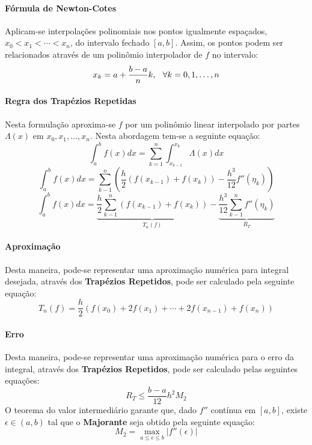 \documentclass{article}
\begin{document}
            \paragraph{Fórmula de Newton-Cotes}Aplicam-se interpolações polinomiais nos pontos igualmente espaçados, $x_{0} < x_{1} < \cdots < x_{n}$, do intervalo fechado $[a, b]$. Assim, os pontos podem ser relacionados através de um polinômio interpolador de $f$ no intervalo:
                \[x_{k} = a + \frac{b - a}{n} k, \hspace{2.5mm} \forall k = 0, 1, \dots, n\]

            \paragraph{Regra dos Trapézios Repetidas}Nesta formulação aproxima-se $f$ por um polinômio linear interpolado por partes $\Lambda(x)$ em $x_{0}, x_{1}, \dots, x_{n}$. Nesta abordagem tem-se a seguinte equação:
                \[\int_{a}^{b} f(x) dx = \sum_{k = 1}^{n} \int_{x_{k-1}}^{x_{k}} \Lambda(x) dx\]
                \[\int_{a}^{b} f(x) dx = \sum_{k - 1}^{n} \left(\frac{h}{2}\left(f(x_{k-1}) + f(x_{k})\right) - \frac{h^{3}}{12} f''(\eta_{k})\right)\]
                \begin{equation}
                    \boxed{
                        \int_{a}^{b} f(x) dx = 
                        \underbrace{\frac{h}{2} \sum_{k - 1}^{n} \left(f(x_{k-1}) + f(x_{k})\right)}_{T_{n}(f)}
                        - 
                        \underbrace{\frac{h^{3}}{12} \sum_{k - 1}^{n} f''(\eta_{k})}_{R_{T}}
                    }
                \end{equation}

            \paragraph{Aproximação}Desta maneira, pode-se representar uma aproximação numérica para integral desejada, através dos \textbf{Trapézios Repetidos}, pode ser calculado pela seguinte equação:
                \[\boxed{T_{n}(f) = \frac{h}{2}\left(f(x_{0}) + 2f(x_{1}) + \cdots + 2f(x_{n-1}) + f(x_{n})\right)}\]

            \paragraph{Erro}Desta maneira, pode-se representar uma aproximação numérica para o erro da integral, através dos \textbf{Trapézios Repetidos}, pode ser calculado pelas seguintes equações:
                \[\boxed{R_{T} \leq \frac{b - a}{12} h^{2} M_{2}}\]
            O teorema do valor intermediário garante que, dado $f''$ contínua em $[a, b]$, existe $\epsilon \in (a, b)$ tal que o \textbf{Majorante} seja obtido pela seguinte equação:
                \[M_{2} = \max_{a\leq\epsilon\leq b} |f''(\epsilon)|\]
\end{document}
